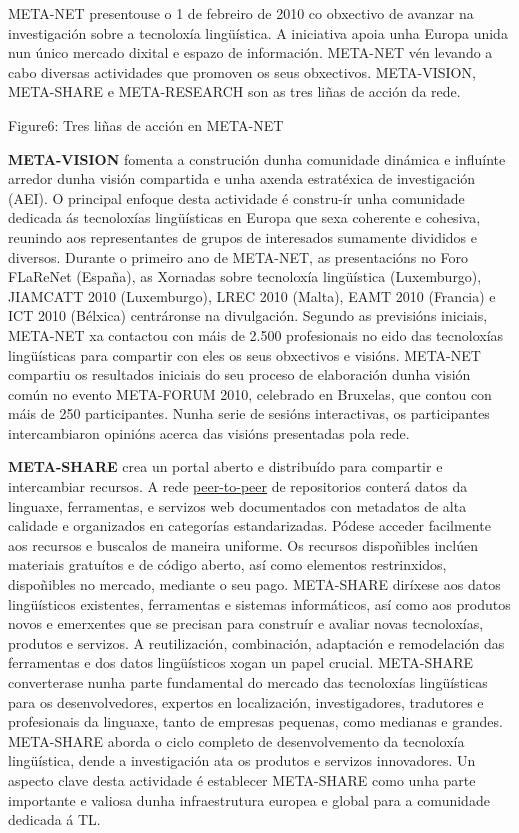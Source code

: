\begin{multicols}{2}

  META-NET presentouse o 1 de febreiro de 2010 co obxectivo de avanzar na investigación sobre a tecnoloxía lingüística. A iniciativa apoia unha Europa unida nun único mercado dixital e espazo de información. META-NET vén levando a cabo diversas actividades que promoven os seus obxectivos. META-VISION, META-SHARE e META-RESEARCH son as tres liñas de acción da rede.

Figure6: Tres liñas de acción en META-NET

\textbf{META-VISION} fomenta a construción dunha comunidade dinámica e influínte arredor dunha visión compartida e unha axenda estratéxica de investigación (AEI). O principal enfoque desta actividade é constru-ír unha comunidade dedicada ás tecnoloxías lingüísticas en Europa que sexa coherente e cohesiva, reunindo aos representantes de grupos de interesados sumamente divididos e diversos. Durante o primeiro ano de META-NET, as presentacións no Foro FLaReNet (España), as Xornadas sobre tecnoloxía lingüística (Luxemburgo), JIAMCATT 2010 (Luxemburgo), LREC 2010 (Malta), EAMT 2010 (Francia) e ICT 2010 (Bélxica) centráronse na divulgación. Segundo as previsións iniciais, META-NET xa contactou con máis de 2.500 profesionais no eido das tecnoloxías lingüísticas para compartir con eles os seus obxectivos e visións. META-NET compartiu os resultados iniciais do seu proceso de elaboración dunha visión común no evento META-FORUM 2010, celebrado en Bruxelas, que contou con máis de 250 participantes. Nunha serie de sesións interactivas, os participantes intercambiaron opinións acerca das visións presentadas pola rede. 

\textbf{META-SHARE} crea un portal aberto e distribuído para compartir e intercambiar recursos. A rede \uline{peer-to-peer} de repositorios conterá datos da linguaxe, ferramentas, e servizos web documentados con metadatos de alta calidade e organizados en categorías estandarizadas. Pódese acceder facilmente aos recursos e buscalos de maneira uniforme. Os recursos dispoñibles inclúen materiais gratuítos e de código aberto, así como elementos restrinxidos, dispoñibles no mercado, mediante o seu pago. META-SHARE diríxese aos datos lingüísticos existentes, ferramentas e sistemas informáticos, así como aos produtos novos e emerxentes que se precisan para construír e avaliar novas tecnoloxías, produtos e servizos. A reutilización, combinación, adaptación e remodelación das ferramentas e dos datos lingüísticos xogan un papel crucial. META-SHARE converterase nunha parte fundamental do mercado das tecnoloxías lingüísticas para os desenvolvedores, expertos en localización, investigadores, tradutores e profesionais da linguaxe, tanto de empresas pequenas, como medianas e grandes. META-SHARE aborda o ciclo completo de desenvolvemento da tecnoloxía lingüística, dende a investigación ata os produtos e servizos innovadores. Un aspecto clave desta actividade é establecer META-SHARE como unha parte importante e valiosa dunha infraestrutura europea e global para a comunidade dedicada á TL. 


\end{multicols}
